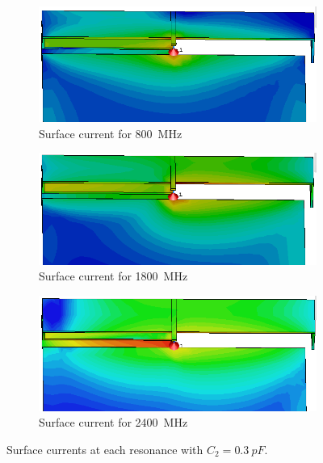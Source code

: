 \begin{figure}[htbp]
   \begin{subfigure}[b]{0.32\linewidth}
        \centering
        \includegraphics[width=\linewidth]{img/tech_sol/monopole/sc_800}
        \caption{Surface current for \SI{800}{MHz}}
        \label{fig:ant1_sc800}
    \end{subfigure}
    \hfill
    \begin{subfigure}[b]{0.32\linewidth}
        \centering
        \includegraphics[width=\linewidth]{img/tech_sol/monopole/sc_1800}
        \caption{Surface current for \SI{1800}{MHz}}
        \label{fig:ant1_sc1800}
    \end{subfigure}
    \hfill
    \begin{subfigure}[b]{0.32\linewidth}
        \centering
        \includegraphics[width=\linewidth]{img/tech_sol/monopole/sc_2400}
        \caption{Surface current for \SI{2400}{MHz}}
        \label{fig:ant1_sc2400}
    \end{subfigure}
    \caption{Surface currents at each resonance with $C_2=\SI{0.3}{pF}$.}
    \label{fig:ant1_sc}
\end{figure}


